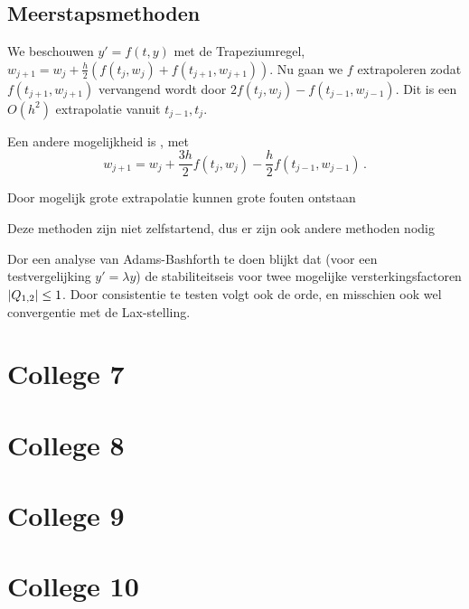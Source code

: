 \documentclass{2wn20summary}
\begin{document}
		\subsection{Meerstapsmethoden}
			We beschouwen $y'=f(t,y)$ met de Trapeziumregel, $w_{j+1} = w_j + \frac{h}{2} (f(t_j,w_j) + f(t_{j+1}, w_{j+1}))$. Nu gaan we $f$ extrapoleren zodat $f(t_{j+1}, w_{j+1})$ vervangend wordt door $2f(t_j,w_j)-f(t_{j-1},w_{j-1})$. Dit is een $O(h^2)$ extrapolatie vanuit $t_{j-1},t_j$.
			
			Een andere mogelijkheid is , met
			\[ 
				w_{j+1} = w_j + \frac{3h}{2} f(t_j,w_j) - \frac{h}{2} f(t_{j-1},w_{j-1}) \,.
			 \]
			 \begin{opm}
			 	Door mogelijk grote extrapolatie kunnen grote fouten ontstaan
			 \end{opm}
			 \begin{opm}
				 Deze methoden zijn niet zelfstartend, dus er zijn ook andere methoden nodig
			 \end{opm}
			 
			 Dor een analyse van Adams-Bashforth te doen blijkt dat (voor een testvergelijking $y'=\lambda y$) de stabiliteitseis voor twee mogelijke versterkingsfactoren ${\left|Q_{1,2}\right|} \le 1$. Door consistentie te testen volgt ook de orde, en misschien ook wel convergentie met de Lax-stelling.
		                  

	\section{College 7}

	\section{College 8}
	
	\section{College 9}
	
	\section{College 10}


	\newpage
	\printindex
	
	
\end{document}
